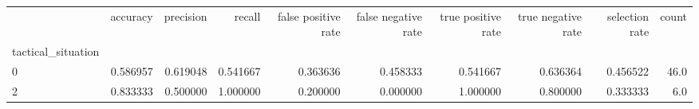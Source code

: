 \begin{tabular}{lrrrrrrrrr}
\toprule
{} &  accuracy &  precision &    recall &  false positive rate &  false negative rate &  true positive rate &  true negative rate &  selection rate &  count \\
tactical\_situation &           &            &           &                      &                      &                     &                     &                 &        \\
\midrule
0                  &  0.586957 &   0.619048 &  0.541667 &             0.363636 &             0.458333 &            0.541667 &            0.636364 &        0.456522 &   46.0 \\
2                  &  0.833333 &   0.500000 &  1.000000 &             0.200000 &             0.000000 &            1.000000 &            0.800000 &        0.333333 &    6.0 \\
\bottomrule
\end{tabular}
